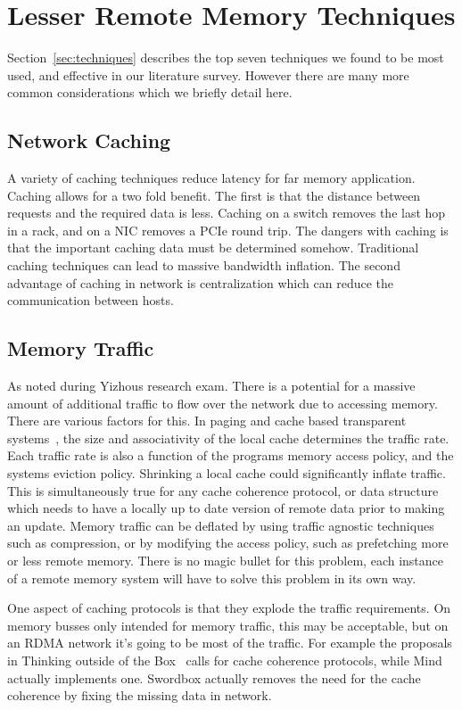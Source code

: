 \section{Lesser Remote Memory Techniques}
\label{sec:additional}

Section~\ref{sec:techniques} describes the top seven techniques we found to be
most used, and effective in our literature survey. However there are many more
common considerations which we briefly detail here.

\subsection{Network Caching} A variety of caching techniques reduce latency for far memory
application. Caching allows for a two fold benefit. The first is that the
distance between requests and the required data is less. Caching on a switch
removes the last hop in a rack, and on a NIC removes a PCIe round trip. The
dangers with caching is that the important caching data must be determined
somehow. Traditional caching techniques can lead to massive bandwidth inflation.
The second advantage of caching in network is centralization which can reduce
the communication between hosts.

\subsection{Memory Traffic} As noted during Yizhous research exam. There is a
potential for a massive amount of additional traffic to flow over the network
due to accessing memory. There are various factors for this. In paging and cache
based transparent systems~\cite{fastswap,kona,gms,infiniswap,legoos,lite}, the
size and associativity of the local cache determines the traffic rate. Each
traffic rate is also a function of the programs memory access policy, and the
systems eviction policy. Shrinking a local cache could significantly inflate
traffic. This is simultaneously true for any cache coherence protocol, or data
structure which needs to have a locally up to date version of remote data prior
to making an update. Memory traffic can be deflated by using traffic agnostic
techniques such as compression, or by modifying the access policy, such as
prefetching more or less remote memory. There is no magic bullet for this
problem, each instance of a remote memory system will have to solve this problem
in its own way.

One aspect of caching protocols is that they explode the traffic requirements.
On memory busses only intended for memory traffic, this may be acceptable, but
on an RDMA network it's going to be most of the traffic. For example the
proposals in Thinking outside of the Box~\cite{design-far-memory-struct} calls
for cache coherence protocols, while Mind~\cite{mind} actually implements one.
Swordbox actually removes the need for the cache coherence by fixing the missing
data in network.

